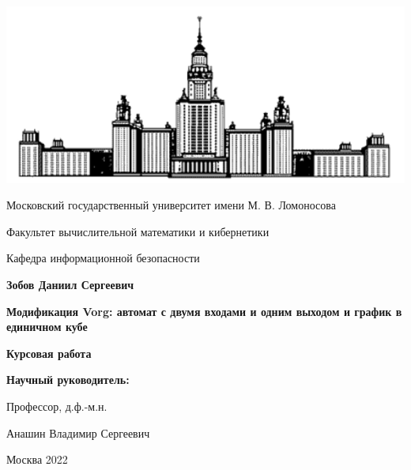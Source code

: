 \thispagestyle{empty}
\begin{center}

\includegraphics{logo.png}

{
    \large
    Московский государственный университет имени М. В. Ломоносова\par
    Факультет вычислительной математики и кибернетики\par
    Кафедра информационной безопасности\par
}
\par
\end{center}

\vspace{10mm}
\begin{flushright}

{\sl}%
\end{flushright}

\begin{center}
%


\vspace{20mm}
	
\bf \large {Зобов Даниил Сергеевич}

\vspace{5mm}
{
    \bf \large
    Модификация Vorg: автомат с двумя входами и одним выходом и график в единичном кубе 
    
    \par
}
\vspace{5mm}

\textbf{Курсовая работа}

\end{center}

\vspace{40mm}

\begin{flushright}

\textbf{Научный руководитель:}

Профессор, д.ф.-м.н.

Анашин Владимир Сергеевич
\end{flushright}

\vspace{20mm}
\begin{center}
{Москва 2022}
\end{center}

\newpage
